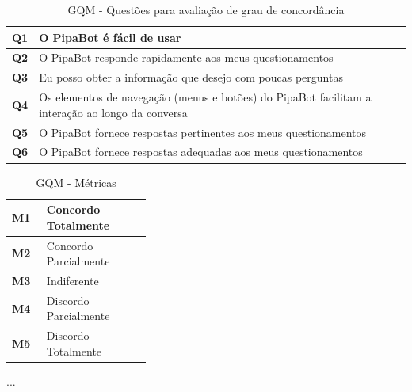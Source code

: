 	\begin{center}
		\begin{table}[h!]
			\centering
			\begin{tabular}{ | m{0.05\linewidth} | m{0.95\linewidth} | } 
				\hline
				\textbf{Q1} & O PipaBot é fácil de usar \\ 
				\hline
				\textbf{Q2} & O PipaBot responde rapidamente aos meus questionamentos \\ 
				\hline
				\textbf{Q3} & Eu posso obter a informação que desejo com poucas perguntas \\ 
				\hline
				\textbf{Q4} & Os elementos de navegação (menus e botões) do PipaBot facilitam a interação ao longo da conversa \\
				\hline
				\textbf{Q5} & O PipaBot fornece respostas pertinentes aos meus questionamentos \\
				\hline
				\textbf{Q6} & O PipaBot fornece respostas adequadas aos meus questionamentos \\
				\hline
			\end{tabular}
			\caption{GQM - Questões para avaliação de grau de concordância}
			\label{tab:questoes}
		\end{table}
	\end{center}

	\begin{center}
		\begin{table}[h!]
			\centering
			\begin{tabular}{ | m{0.05\linewidth} | m{0.3\linewidth} | } 
				\hline
				\textbf{M1} & Concordo Totalmente \\ 
				\hline
				\textbf{M2} & Concordo Parcialmente \\ 
				\hline
				\textbf{M3} & Indiferente \\ 
				\hline
				\textbf{M4} & Discordo Parcialmente \\
				\hline
				\textbf{M5} & Discordo Totalmente \\
				\hline
			\end{tabular}
			\caption{GQM - Métricas}
			\label{tab:metricas}
		\end{table}
	\end{center}

	...

